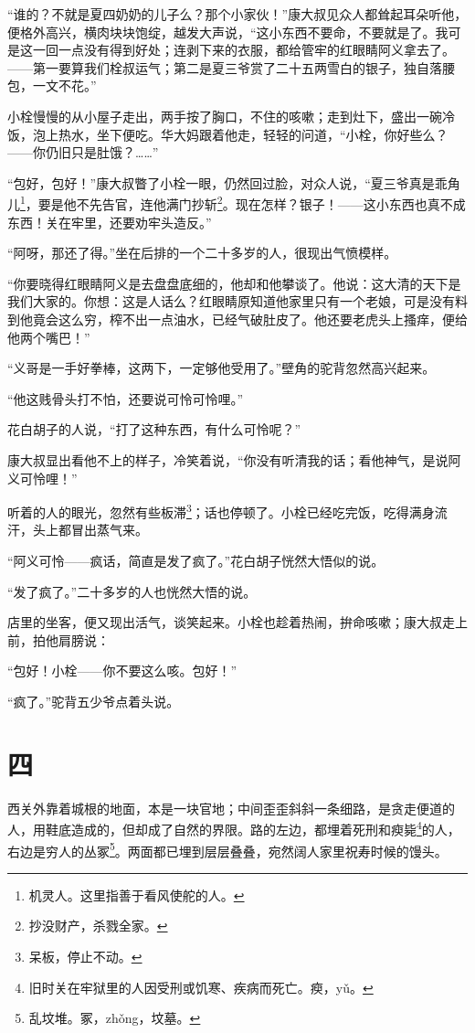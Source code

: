 \documentclass[12pt,UTF8]{ctexbook}
\begin{document}
“谁的？不就是夏四奶奶的儿子么？那个小家伙！”康大叔见众人都耸起耳朵听他，便格外高兴，横肉块块饱绽，越发大声说，“这小东西不要命，不要就是了。我可是这一回一点没有得到好处；连剥下来的衣服，都给管牢的红眼睛阿义拿去了。——第一要算我们栓叔运气；第二是夏三爷赏了二十五两雪白的银子，独自落腰包，一文不花。”

小栓慢慢的从小屋子走出，两手按了胸口，不住的咳嗽；走到灶下，盛出一碗冷饭，泡上热水，坐下便吃。华大妈跟着他走，轻轻的问道，“小栓，你好些么？——你仍旧只是肚饿？……”

“包好，包好！”康大叔瞥了小栓一眼，仍然回过脸，对众人说，“夏三爷真是乖角儿\footnote{机灵人。这里指善于看风使舵的人。}，要是他不先告官，连他满门抄斩\footnote{抄没财产，杀戮全家。}。现在怎样？银子！——这小东西也真不成东西！关在牢里，还要劝牢头造反。”

“阿呀，那还了得。”坐在后排的一个二十多岁的人，很现出气愤模样。

“你要晓得红眼睛阿义是去盘盘底细的，他却和他攀谈了。他说：这大清的天下是我们大家的。你想：这是人话么？红眼睛原知道他家里只有一个老娘，可是没有料到他竟会这么穷，榨不出一点油水，已经气破肚皮了。他还要老虎头上搔痒，便给他两个嘴巴！”

“义哥是一手好拳棒，这两下，一定够他受用了。”壁角的驼背忽然高兴起来。

“他这贱骨头打不怕，还要说可怜可怜哩。”

花白胡子的人说，“打了这种东西，有什么可怜呢？”

康大叔显出看他不上的样子，冷笑着说，“你没有听清我的话；看他神气，是说阿义可怜哩！”

听着的人的眼光，忽然有些板滞\footnote{呆板，停止不动。}；话也停顿了。小栓已经吃完饭，吃得满身流汗，头上都冒出蒸气来。

“阿义可怜——疯话，简直是发了疯了。”花白胡子恍然大悟似的说。

“发了疯了。”二十多岁的人也恍然大悟的说。

店里的坐客，便又现出活气，谈笑起来。小栓也趁着热闹，拚命咳嗽；康大叔走上前，拍他肩膀说：

“包好！小栓——你不要这么咳。包好！”

“疯了。”驼背五少爷点着头说。

\chapter{四}

西关外靠着城根的地面，本是一块官地；中间歪歪斜斜一条细路，是贪走便道的人，用鞋底造成的，但却成了自然的界限。路的左边，都埋着死刑和瘐毙\footnote{旧时关在牢狱里的人因受刑或饥寒、疾病而死亡。瘐，yǔ。}的人，右边是穷人的丛冢\footnote{乱坟堆。冢，zhǒng，坟墓。}。两面都已埋到层层叠叠，宛然阔人家里祝寿时候的馒头。
\end{document}
